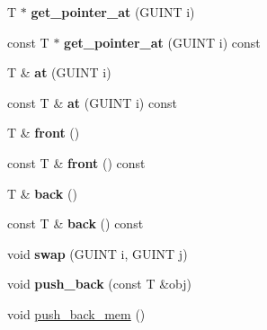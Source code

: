\begin{DoxyCompactItemize}
\item 
\hypertarget{classgim__array_a8d24180b31e4b971b0b0d3ee07b0e0f0}{T $\ast$ {\bfseries get\+\_\+pointer\+\_\+at} (G\+U\+I\+N\+T i)}\label{classgim__array_a8d24180b31e4b971b0b0d3ee07b0e0f0}

\item 
\hypertarget{classgim__array_a6efb68392541540d4296c17cf5701180}{const T $\ast$ {\bfseries get\+\_\+pointer\+\_\+at} (G\+U\+I\+N\+T i) const }\label{classgim__array_a6efb68392541540d4296c17cf5701180}

\item 
\hypertarget{classgim__array_ae76ad8c556a353a67d4331a9def31676}{T \& {\bfseries at} (G\+U\+I\+N\+T i)}\label{classgim__array_ae76ad8c556a353a67d4331a9def31676}

\item 
\hypertarget{classgim__array_a7fa4ff76507c5c21ebc457f8f7a6f8e6}{const T \& {\bfseries at} (G\+U\+I\+N\+T i) const }\label{classgim__array_a7fa4ff76507c5c21ebc457f8f7a6f8e6}

\item 
\hypertarget{classgim__array_a60fc3e0355cfdc09cc169c1c595d5d1b}{T \& {\bfseries front} ()}\label{classgim__array_a60fc3e0355cfdc09cc169c1c595d5d1b}

\item 
\hypertarget{classgim__array_a17ff783ecef011db202aacc17b010f0d}{const T \& {\bfseries front} () const }\label{classgim__array_a17ff783ecef011db202aacc17b010f0d}

\item 
\hypertarget{classgim__array_aab58b1694b45fbd101c64258ac105669}{T \& {\bfseries back} ()}\label{classgim__array_aab58b1694b45fbd101c64258ac105669}

\item 
\hypertarget{classgim__array_a2c57545ddaf341ef78cc5d37dc051c4a}{const T \& {\bfseries back} () const }\label{classgim__array_a2c57545ddaf341ef78cc5d37dc051c4a}

\item 
\hypertarget{classgim__array_a99a6869a790e5d746d455b56f1d65e32}{void {\bfseries swap} (G\+U\+I\+N\+T i, G\+U\+I\+N\+T j)}\label{classgim__array_a99a6869a790e5d746d455b56f1d65e32}

\item 
\hypertarget{classgim__array_a45b9c313cf887ed8a2fd6d1895b2c309}{void {\bfseries push\+\_\+back} (const T \&obj)}\label{classgim__array_a45b9c313cf887ed8a2fd6d1895b2c309}

\item 
\hypertarget{classgim__array_acbd3ad9a6756d0b91e42549a0e7107f0}{void \hyperlink{classgim__array_acbd3ad9a6756d0b91e42549a0e7107f0}{push\+\_\+back\+\_\+mem} ()}\label{classgim__array_acbd3ad9a6756d0b91e42549a0e7107f0}


\end{DoxyCompactItemize}
